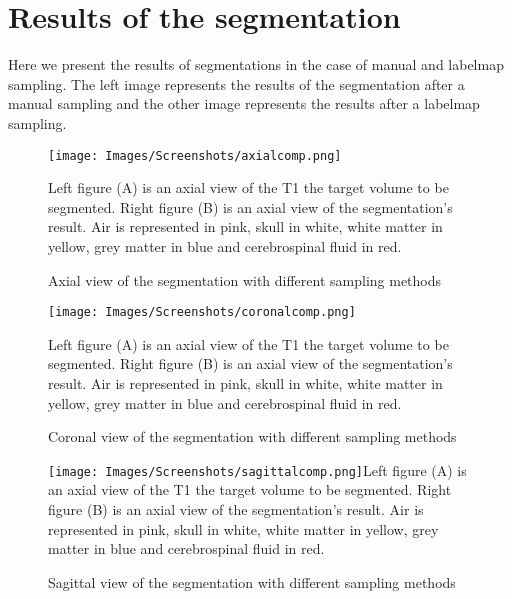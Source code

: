 \chapter{Results of the segmentation}\label{app:results}
Here we present the results of segmentations in the case of manual and labelmap sampling. The left image represents the results of the segmentation after a manual sampling and the other image represents the results after a labelmap sampling.


  \begin{figure}[htb]\centering
  \texttt{[image: Images/Screenshots/axialcomp.png]}
  \caption{Axial view of the segmentation with different sampling methods}{Left figure (A) is an axial view of the T1 the target volume to be segmented. Right figure (B) is an axial view of the segmentation's result. Air is represented in pink, skull in white, white matter in yellow, grey matter in blue and cerebrospinal fluid in red.}
  \end{figure}


  \begin{figure}[htb]\centering
  \texttt{[image: Images/Screenshots/coronalcomp.png]}
  \caption{Coronal view of the segmentation with different sampling methods}{Left figure (A) is an axial view of the T1 the target volume to be segmented. Right figure (B) is an axial view of the segmentation's result. Air is represented in pink, skull in white, white matter in yellow, grey matter in blue and cerebrospinal fluid in red.}
  \end{figure}


  \begin{figure}[htb]\centering
  \texttt{[image: Images/Screenshots/sagittalcomp.png]}{Left figure (A) is an axial view of the T1 the target volume to be segmented. Right figure (B) is an axial view of the segmentation's result. Air is represented in pink, skull in white, white matter in yellow, grey matter in blue and cerebrospinal fluid in red.}
  \caption{Sagittal view of the segmentation with different sampling methods}\label{fig:NC_C_L}
  \end{figure}